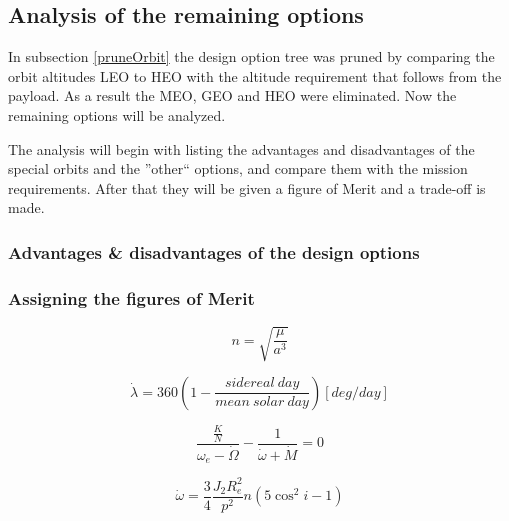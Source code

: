 \documentclass{article}
\begin{document}
\subsection{Analysis of the remaining options}
\label{OrbAnal}

In subsection \ref{pruneOrbit} the design option tree was pruned by comparing the orbit altitudes \ac{LEO} to \ac{HEO} with the altitude requirement that follows from the payload. As a result the \acs{MEO}, \acs{GEO} and \acs{HEO} were eliminated. Now the remaining options will be analyzed.

The analysis will begin with listing the advantages and disadvantages of the special orbits and the ''other`` options, and compare them with the mission requirements. After that they will be given a figure of Merit and a trade-off is made.

\subsubsection{Advantages \& disadvantages of the design options}



\subsubsection{Assigning the figures of Merit}



\begin{equation}
n = \sqrt {\frac{\mu }
{{a^3 }}} 
\end{equation}

\begin{equation}
\dot \lambda  = 360\left( {1 - \frac{{sidereal\ day}}
{{mean\ solar\ day}}} \right) [deg/day]
\end{equation}


\begin{equation}
\frac{{\frac{K}
{N}}}
{{\omega _e  - \dot \Omega }} - \frac{1}
{{\dot \omega  + \dot M}} = 0
\end{equation}

\begin{equation}
\dot \omega  = \frac{3}
{4}\frac{{J_2 R_e^2 }}
{{p^2 }}n\left( {5\cos ^2 i - 1} \right)
\end{equation}
\end{document}
